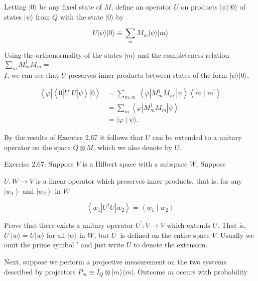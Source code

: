 \documentclass[10pt]{article}
\begin{document}
Letting $|0\rangle$ be any fixed state of $M$, define an operator $U$ on products $|\psi\rangle|0\rangle$ of states $|\psi\rangle$ from $Q$ with the state $|0\rangle$ by


\begin{equation*}
U|\psi\rangle|0\rangle \equiv \sum_{m} M_{m}|\psi\rangle|m\rangle \tag{2.122}
\end{equation*}


Using the orthonormality of the states $|m\rangle$ and the completeness relation $\sum_{m} M_{m}^{\dagger} M_{m}=$\\
$I$, we can see that $U$ preserves inner products between states of the form $|\psi\rangle|0\rangle$,


\begin{align*}
\left\langle\varphi\left|\left\langle 0\left|U^{\dagger} U\right| \psi\right\rangle\right| 0\right\rangle & =\sum_{m, m^{\prime}}\left\langle\varphi\left|M_{m}^{\dagger} M_{m^{\prime}}\right| \psi\right\rangle\left\langle m \mid m^{\prime}\right\rangle  \tag{2.123}\\
& =\sum_{m}\left\langle\varphi\left|M_{m}^{\dagger} M_{m}\right| \psi\right\rangle  \tag{2.124}\\
& =\langle\varphi \mid \psi\rangle . \tag{2.125}
\end{align*}


By the results of Exercise 2.67 it follows that $U$ can be extended to a unitary operator on the space $Q \otimes M$, which we also denote by $U$.

Exercise 2.67: Suppose $V$ is a Hilbert space with a subspace $W$. Suppose

$U: W \rightarrow V$ is a linear operator which preserves inner products, that is, for any $\left|w_{1}\right\rangle$ and $\left|w_{2}\right\rangle$ in $W$


\begin{equation*}
\left\langle w_{1}\left|U^{\dagger} U\right| w_{2}\right\rangle=\left\langle w_{1} \mid w_{2}\right\rangle \tag{2.126}
\end{equation*}


Prove that there exists a unitary operator $U^{\prime}: V \rightarrow V$ which extends $U$. That is, $U^{\prime}|w\rangle=U|w\rangle$ for all $|w\rangle$ in $W$, but $U^{\prime}$ is defined on the entire space $V$. Usually we omit the prime symbol ' and just write $U$ to denote the extension.

Next, suppose we perform a projective measurement on the two systems described by projectors $P_{m} \equiv I_{Q} \otimes|m\rangle\langle m|$. Outcome $m$ occurs with probability
\end{document}
